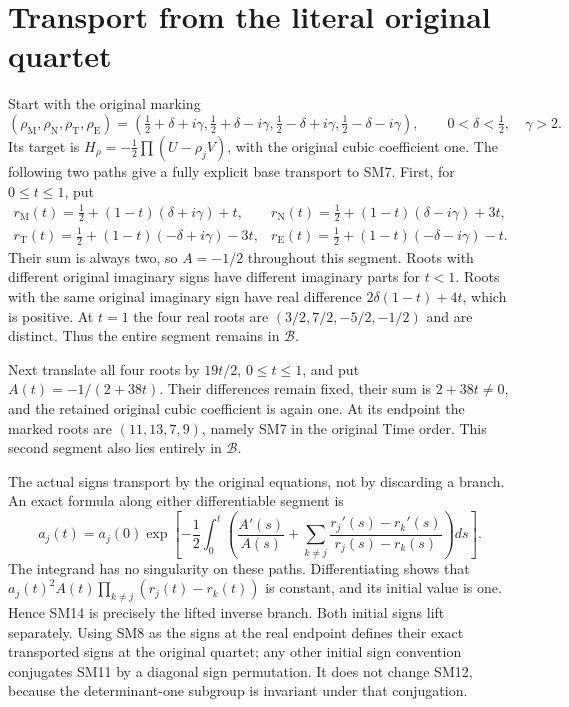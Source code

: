\section{Transport from the literal original quartet}
Start with the original marking
\[
 (\rho_{\mathrm M},\rho_{\mathrm N},\rho_{\mathrm T},\rho_{\mathrm E})
 =\left(\tfrac12+\delta+i\gamma,\tfrac12+\delta-i\gamma,
        \tfrac12-\delta+i\gamma,\tfrac12-\delta-i\gamma\right),
 \qquad0<\delta<\tfrac12,\quad\gamma>2.
\]
Its target is $H_\rho=-\frac12\prod(U-\rho_jV)$, with the
original cubic coefficient one. The following two paths give a
fully explicit base transport to SM7. First, for $0\le t\le1$,
put
\begin{equation}
 \begin{array}{ll}
 r_{\mathrm M}(t)=\tfrac12+(1-t)(\delta+i\gamma)+t,
 &r_{\mathrm N}(t)=\tfrac12+(1-t)(\delta-i\gamma)+3t,\\
 r_{\mathrm T}(t)=\tfrac12+(1-t)(-\delta+i\gamma)-3t,
 &r_{\mathrm E}(t)=\tfrac12+(1-t)(-\delta-i\gamma)-t.
 \end{array}\tag{SM13}
\end{equation}
Their sum is always two, so $A=-1/2$ throughout this segment.
Roots with different original imaginary signs have different
imaginary parts for $t<1$. Roots with the same original imaginary
sign have real difference $2\delta(1-t)+4t$, which is positive.
At $t=1$ the four real roots are $(3/2,7/2,-5/2,-1/2)$ and
are distinct. Thus the entire segment remains in $\mathcal B$.

Next translate all four roots by $19t/2$, $0\le t\le1$, and
put $A(t)=-1/(2+38t)$. Their differences remain fixed, their sum
is $2+38t\ne0$, and the retained original cubic coefficient is
again one. At its endpoint the marked roots are
$(11,13,7,9)$, namely SM7 in the original Time order. This
second segment also lies entirely in $\mathcal B$.

The actual signs transport by the original equations, not by
discarding a branch. An exact formula along either differentiable
segment is
\begin{equation}
 a_j(t)=a_j(0)\exp\left[-\frac12\int_0^t
 \left(\frac{A'(s)}{A(s)}+
 \sum_{k\ne j}\frac{r_j'(s)-r_k'(s)}{r_j(s)-r_k(s)}\right)ds\right].
 \tag{SM14}
\end{equation}
The integrand has no singularity on these paths. Differentiating
shows that $a_j(t)^2A(t)\prod_{k\ne j}(r_j(t)-r_k(t))$ is
constant, and its initial value is one. Hence SM14 is precisely
the lifted inverse branch. Both initial signs lift separately.
Using SM8 as the signs at the real endpoint defines their exact
transported signs at the original quartet; any other initial
sign convention conjugates SM11 by a diagonal sign permutation.
It does not change SM12, because the determinant-one subgroup
is invariant under that conjugation.

